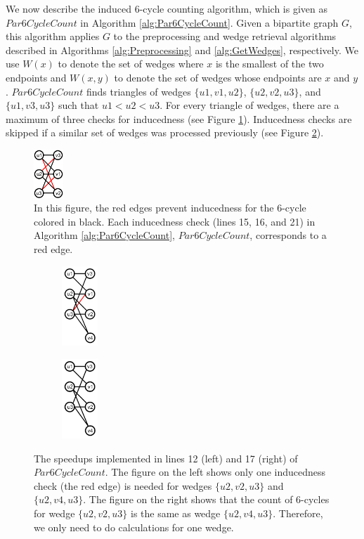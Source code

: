 \documentclass[11pt]{article}
\begin{document}
We now describe the induced 6-cycle counting algorithm, which is given as $Par6CycleCount$ in Algorithm \ref{alg:Par6CycleCount}.
Given a bipartite graph $G$, this algorithm applies $G$ to the preprocessing and wedge retrieval algorithms described in Algorithms \ref{alg:Preprocessing} and \ref{alg:GetWedges}, respectively.
We use $W(x)$ to denote the set of wedges where $x$ is the smallest of the two endpoints and $W(x, y)$ to denote the set of wedges whose endpoints are $x$ and $y$.
$Par6CycleCount$ finds triangles of wedges $\{u1, v1, u2\}$, $\{u2, v2, u3\}$, and $\{u1, v3, u3\}$ such that $u1 < u2 < u3$.
For every triangle of wedges, there are a maximum of three checks for inducedness (see Figure \ref{fig:inducedness}).
Inducedness checks are skipped if a similar set of wedges was processed previously (see Figure \ref{fig:speedups}).

\begin{figure}[h]
    \centering
    \includegraphics[width=0.1\textwidth]{figures/Inducedness.png}
    \caption{\small In this figure, the red edges prevent inducedness for the 6-cycle colored in black. Each inducedness check (lines 15, 16, and 21) in Algorithm \ref{alg:Par6CycleCount}, $Par6CycleCount$, corresponds to a red edge.}
    \label{fig:inducedness}
\end{figure}

\begin{figure}[h]
    \centering
    \begin{subfigure}{.1\textwidth}
        \centering
        \includegraphics[height=3cm]{figures/speedup1.png}
    \end{subfigure}
    \begin{subfigure}{.1\textwidth}
        \centering
        \includegraphics[height=3cm]{figures/speedup2.png}
    \end{subfigure}
    \caption{\small The speedups implemented in lines 12 (left) and 17 (right) of $Par6CycleCount$. The figure on the left shows only one inducedness check (the red edge) is needed for wedges $\{u2, v2, u3\}$ and $\{u2, v4, u3\}$. The figure on the right shows that the count of 6-cycles for wedge $\{u2, v2, u3\}$ is the same as wedge $\{u2, v4, u3\}$. Therefore, we only need to do calculations for one wedge.}
    \label{fig:speedups}
\end{figure}
\end{document}
